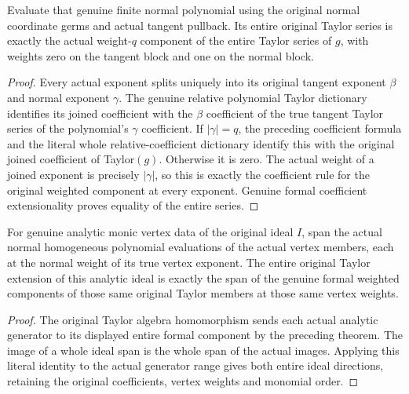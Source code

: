 \begin{theorem}
\label{hir:actual-normal-homogeneous-entire-taylor-realization}
\leanok
Evaluate that genuine finite normal polynomial using the original
normal coordinate germs and actual tangent pullback. Its entire original
Taylor series is exactly the actual weight-$q$ component of the entire
Taylor series of $g$, with weights zero on the tangent block and one
on the normal block.
\end{theorem}
\begin{proof}
Every actual exponent splits uniquely into its original tangent exponent
$\beta$ and normal exponent $\gamma$. The genuine relative polynomial
Taylor dictionary identifies its joined coefficient with the $\beta$
coefficient of the true tangent Taylor series of the polynomial's
$\gamma$ coefficient. If $|\gamma|=q$, the preceding coefficient formula
and the literal whole relative-coefficient dictionary identify this
with the original joined coefficient of Taylor$(g)$. Otherwise it is
zero. The actual weight of a joined exponent is precisely
$|\gamma|$, so this is exactly the coefficient rule for the original
weighted component at every exponent. Genuine formal coefficient
extensionality proves equality of the entire series.
\end{proof}

\begin{theorem}
\label{hir:actual-analytic-normal-vertex-symbol-formal-extension}
\leanok
For genuine analytic monic vertex data of the original ideal $I$, span
the actual normal homogeneous polynomial evaluations of the actual
vertex members, each at the normal weight of its true vertex exponent.
The entire original Taylor extension of this analytic ideal is exactly
the span of the genuine formal weighted components of those same
original Taylor members at those same vertex weights.
\end{theorem}
\begin{proof}
The original Taylor algebra homomorphism sends each actual analytic
generator to its displayed entire formal component by the preceding
theorem. The image of a whole ideal span is the whole span of the actual
images. Applying this literal identity to the actual generator range
gives both entire ideal directions, retaining the original coefficients,
vertex weights and monomial order.
\end{proof}

